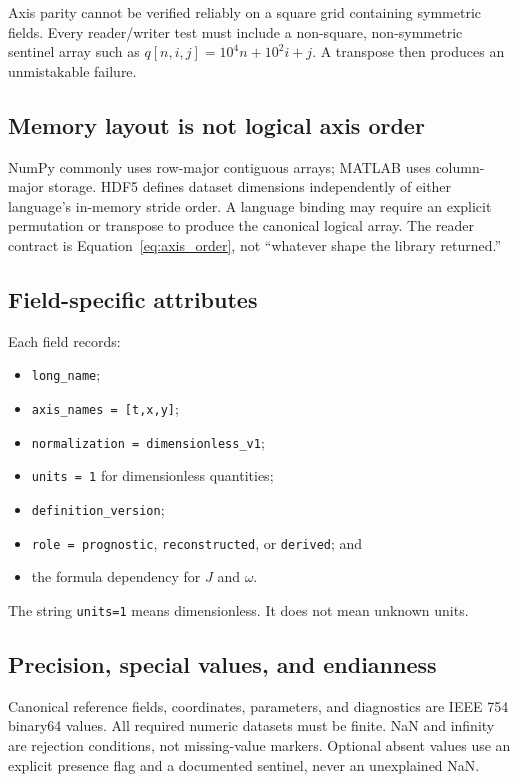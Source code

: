 \documentclass[11pt]{article}
\newcommand{\code}[1]{\texttt{#1}}
\begin{document}
\begin{checkpointbox}
Axis parity cannot be verified reliably on a square grid containing symmetric fields. Every reader/writer test must include a non-square, non-symmetric sentinel array such as $q[n,i,j]=10^4n+10^2i+j$. A transpose then produces an unmistakable failure.
\end{checkpointbox}

\subsection{Memory layout is not logical axis order}

NumPy commonly uses row-major contiguous arrays; MATLAB uses column-major storage. HDF5 defines dataset dimensions independently of either language's in-memory stride order. A language binding may require an explicit permutation or transpose to produce the canonical logical array. The reader contract is Equation~\eqref{eq:axis_order}, not ``whatever shape the library returned.''

\subsection{Field-specific attributes}

Each field records:
\begin{itemize}
  \item \code{long\_name};
  \item \code{axis\_names = [t,x,y]};
  \item \code{normalization = dimensionless\_v1};
  \item \code{units = 1} for dimensionless quantities;
  \item \code{definition\_version};
  \item \code{role = prognostic}, \code{reconstructed}, or \code{derived}; and
  \item the formula dependency for $J$ and $\omega$.
\end{itemize}
The string \code{units=1} means dimensionless. It does not mean unknown units.

\subsection{Precision, special values, and endianness}

Canonical reference fields, coordinates, parameters, and diagnostics are IEEE 754 binary64 values. All required numeric datasets must be finite. NaN and infinity are rejection conditions, not missing-value markers. Optional absent values use an explicit presence flag and a documented sentinel, never an unexplained NaN.
\end{document}
